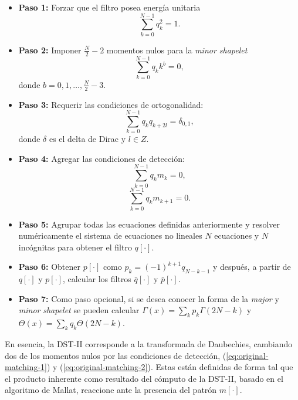 \begin{itemize}
	\item \textbf{Paso 1:} Forzar que el filtro posea energía unitaria
		\begin{equation}\label{eq:unitary-energy}
			\sum_{k=0}^{N-1}q_k^2 = 1.
		\end{equation}
	\item \textbf{Paso 2:} Imponer $\frac{N}{2} -2 $ momentos nulos para la \textit{minor shapelet}
		\begin{equation}\label{eq:vanishing-moments}
			\sum_{k=0}^{N-1}q_{k}k^b = 0,
		\end{equation}
		donde $b=0,1,\dotsc,\frac{N}{2}-3$.
	\item \textbf{Paso 3:} Requerir las condiciones de ortogonalidad:
		\begin{equation}\label{eq:orthogonality}
			\sum_{k=0}^{N-1} q_{k}q_{k+2l} = \delta_{0,1},
		\end{equation}
		donde $\delta$ es el delta de Dirac y $l\in Z$.
	\item \textbf{Paso 4:} Agregar las condiciones de detección: 
		\begin{equation}\label{eq:original-matching-1}
			\sum_{k=0}^{N-1} q_{k}m_{k} = 0,
		\end{equation}
		\begin{equation}\label{eq:original-matching-2}
			\sum_{k=0}^{N-1} q_{k}m_{k+1} = 0.
		\end{equation}
	\item \textbf{Paso 5:} Agrupar todas las ecuaciones definidas anteriormente y resolver numéricamente
		el sistema de ecuaciones no lineales $N$ ecuaciones y $N$ incógnitas para obtener el filtro $q[\cdot]$.
	\item \textbf{Paso 6:} Obtener $p[\cdot]$ como $p_k=(-1)^{k+1}q_{N-k-1}$ y 
		después, a partir de $q[\cdot]$ y $p[\cdot]$, calcular los filtros $\bar q[\cdot]$ y $\bar p[\cdot]$.
	\item \textbf{Paso 7:} Como paso opcional, si se desea conocer la forma de la \textit{major} y \textit{minor}
		\textit{shapelet} se pueden calcular $\displaystyle \Gamma(x)=\sum_k p_k \Gamma(2N-k)$ y 
		$\displaystyle \Theta(x)=\sum_k q_k \Theta(2N-k)$.
\end{itemize}

En esencia, la DST-II corresponde a la transformada de Daubechies, cambiando dos de los momentos nulos por las
condiciones de detección, (\ref{eq:original-matching-1}) y (\ref{eq:original-matching-2}). 
Estas están definidas de forma tal que el
producto inherente como resultado del cómputo de la DST-II, basado en el algoritmo de Mallat, reaccione ante 
la presencia del patrón $m[\cdot]$.

